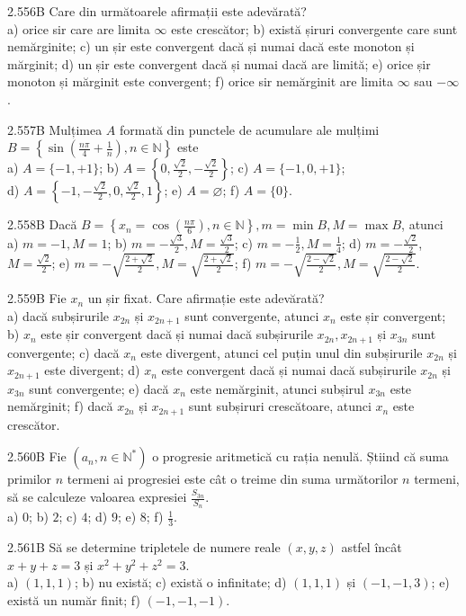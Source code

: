 \documentclass[11pt]{article}
\begin{document}
2.556B Care din următoarele afirmații este adevărată?\\ a) orice sir care are limita $\infty$ este crescător; b) există șiruri convergente care sunt nemărginite; c) un șir este convergent dacă și numai dacă este monoton și mărginit; d) un șir este convergent dacă și numai dacă are limită; e) orice șir monoton și mărginit este convergent; f) orice sir nemărginit are limita $\infty$ sau $-\infty$.

2.557B Mulțimea $A$ formată din punctele de acumulare ale mulțimi $B=\left\{\sin \left(\frac{n \pi}{4}+\frac{1}{n}\right), n \in \mathbb{N}\right\}$ este\\ a) $A=\{-1,+1\}$; b) $A=\left\{0, \frac{\sqrt{2}}{2},-\frac{\sqrt{2}}{2}\right\}$; c) $A=\{-1,0,+1\}$;\\ d) $A=\left\{-1,-\frac{\sqrt{2}}{2}, 0, \frac{\sqrt{2}}{2}, 1\right\}$; e) $A=\varnothing$; f) $A=\{0\}$.

2.558B Dacă $B=\left\{x_{n}=\cos \left(\frac{n \pi}{6}\right), n \in \mathbb{N}\right\}, m=\min B, M=\max B$, atunci\\ a) $m=-1, M=1$; b) $m=-\frac{\sqrt{3}}{2}, M=\frac{\sqrt{3}}{2}$; c) $m=-\frac{1}{2}, M=\frac{1}{4}$; d) $m=-\frac{\sqrt{2}}{2}$, $M=\frac{\sqrt{2}}{2}$; e) $m=-\sqrt{\frac{2+\sqrt{2}}{2}}, M=\sqrt{\frac{2+\sqrt{2}}{2}}$; f) $m=-\sqrt{\frac{2-\sqrt{2}}{2}}, M=\sqrt{\frac{2-\sqrt{2}}{2}}$.

2.559B Fie $x_{n}$ un șir fixat. Care afirmație este adevărată?\\ a) dacă subșirurile $x_{2 n}$ și $x_{2 n+1}$ sunt convergente, atunci $x_{n}$ este șir convergent; b) $x_{n}$ este șir convergent dacă și numai dacă subșirurile $x_{2 n}, x_{2 n+1}$ și $x_{3 n}$ sunt convergente; c) dacă $x_{n}$ este divergent, atunci cel puțin unul din subșirurile $x_{2 n}$ și $x_{2 n+1}$ este divergent; d) $x_{n}$ este convergent dacă și numai dacă subșirurile $x_{2 n}$ și $x_{3 n}$ sunt convergente; e) dacă $x_{n}$ este nemărginit, atunci subșirul $x_{3 n}$ este nemărginit; f) dacă $x_{2 n}$ și $x_{2 n+1}$ sunt subșiruri crescătoare, atunci $x_{n}$ este crescător.

2.560B Fie $\left(a_{n}, n \in \mathbb{N}^{*}\right)$ o progresie aritmetică cu rația nenulă. Știind că suma primilor $n$ termeni ai progresiei este cât o treime din suma următorilor $n$ termeni, să se calculeze valoarea expresiei $\frac{S_{3 n}}{S_{n}}$.\\ a) $0$; b) $2$; c) $4$; d) $9$; e) $8$; f) $\frac{1}{3}$.

2.561B Să se determine tripletele de numere reale $(x, y, z)$ astfel încât $x+y+z=3$ și $x^{2}+y^{2}+z^{2}=3$.\\ a) $(1,1,1)$; b) nu există; c) există o infinitate; d) $(1,1,1)$ și $(-1,-1,3)$; e) există un număr finit; f) $(-1,-1,-1)$.
\end{document}
